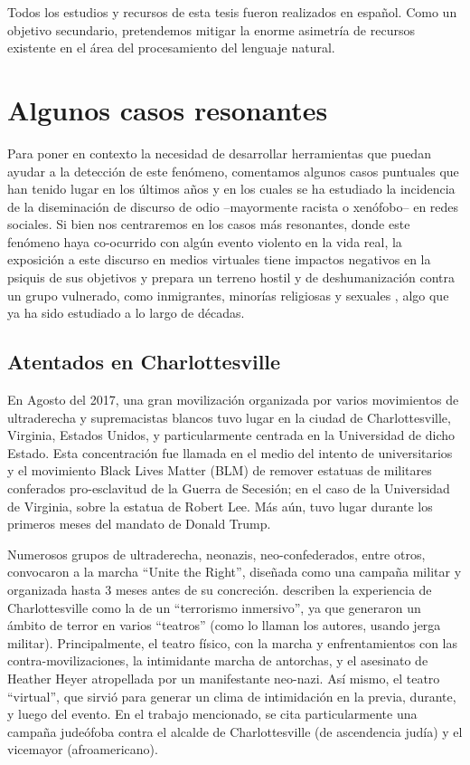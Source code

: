 Todos los estudios y recursos de esta tesis fueron realizados en español. Como un objetivo secundario, pretendemos mitigar la enorme asimetría de recursos existente en el área del procesamiento del lenguaje natural.


\section{Algunos casos resonantes}

Para poner en contexto la necesidad de desarrollar herramientas que puedan ayudar a la detección de este fenómeno, comentamos algunos casos puntuales que han tenido lugar en los últimos años y en los cuales se ha estudiado la incidencia de la diseminación de discurso de odio --mayormente racista o xenófobo-- en redes sociales. Si bien nos centraremos en los casos más resonantes, donde este fenómeno haya co-ocurrido con algún evento violento en la vida real, la exposición a este discurso en medios virtuales tiene impactos negativos en la psiquis de sus objetivos \cite{saha2019prevalence} y prepara un terreno hostil y de deshumanización contra un grupo vulnerado, como inmigrantes, minorías religiosas y sexuales \cite{bilewicz2020hate}, algo que ya ha sido estudiado a lo largo de décadas.


\subsection{Atentados en Charlottesville}

En Agosto del 2017, una gran movilización organizada por varios movimientos de ultraderecha y supremacistas blancos tuvo lugar en la ciudad de Charlottesville, Virginia, Estados Unidos, y particularmente centrada en la Universidad de dicho Estado. Esta concentración fue llamada en el medio del intento de universitarios y el movimiento Black Lives Matter (BLM) de remover estatuas de militares conferados pro-esclavitud de la Guerra de Secesión; en el caso de la Universidad de Virginia, sobre la estatua de Robert Lee. Más aún, tuvo lugar durante los primeros meses del mandato de Donald Trump.

Numerosos grupos de ultraderecha, neonazis, neo-confederados, entre otros, convocaron a la marcha ``Unite the Right'', diseñada como una campaña militar y organizada hasta 3 meses antes de su concreción. \citet{blout2020white} describen la experiencia de Charlottesville como la de un ``terrorismo inmersivo'', ya que generaron un ámbito de terror en varios ``teatros'' (como lo llaman los autores, usando jerga militar). Principalmente, el teatro físico, con la marcha y enfrentamientos con las contra-movilizaciones, la intimidante marcha de antorchas, y el asesinato de Heather Heyer atropellada por un manifestante neo-nazi. Así mismo, el teatro ``virtual'', que sirvió para generar un clima de intimidación en la previa, durante, y luego del evento. En el trabajo mencionado, se cita particularmente una campaña judeófoba contra el alcalde de Charlottesville (de ascendencia judía) y el vicemayor (afroamericano).

